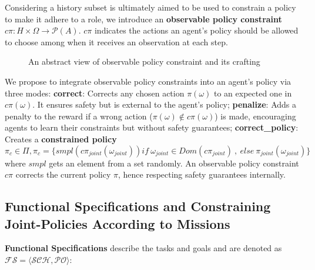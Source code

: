 \documentclass[sn-mathphys-num]{sn-jnl}%
\theoremstyle{thmstyleone}%
\theoremstyle{thmstyletwo}%
\theoremstyle{thmstylethree}%
\begin{document}
Considering a history subset is ultimately aimed to be used to constrain a policy to make it adhere to a role, we introduce an \textbf{observable policy constraint} $c\pi: H \times \Omega \rightarrow \mathcal{P}(A)$. $c\pi$ indicates the actions an agent's policy should be allowed to choose among when it receives an observation at each step.

\begin{figure}[h!]
    \centering
    
    \caption{An abstract view of observable policy constraint and its crafting}
    \label{fig:PRAHOM_opc}
\end{figure}

We propose to integrate observable policy constraints into an agent's policy via three modes:
\textbf{correct}: Corrects any chosen action $\pi(\omega)$ to an expected one in $c\pi(\omega)$. It ensures safety but is external to the agent's policy; \quad
\textbf{penalize}: Adds a penalty to the reward if a wrong action ($\pi(\omega) \notin c\pi(\omega)$) is made, encouraging agents to learn their constraints but without safety guarantees; \quad
\textbf{correct\_policy}: Creates a \textbf{constrained policy} $\pi_c \in \Pi, \pi_c = \{smpl(c\pi_{joint}(\omega_{joint})) \allowbreak if \ \omega_{joint} \in Dom(c\pi_{joint}) \ \allowbreak, \ \allowbreak else \ \allowbreak \pi_{joint}(\omega_{joint})\}$ where $smpl$ gets an element from a set randomly. An observable policy constraint $c\pi$ corrects the current policy $\pi$, hence respecting safety guarantees internally.



\subsection{Functional Specifications and Constraining Joint-Policies According to Missions}

\textbf{Functional Specifications} describe the tasks and goals and are denoted as $\mathcal{FS} = \langle \mathcal{SCH}, \mathcal{PO} \rangle$:
\end{document}
